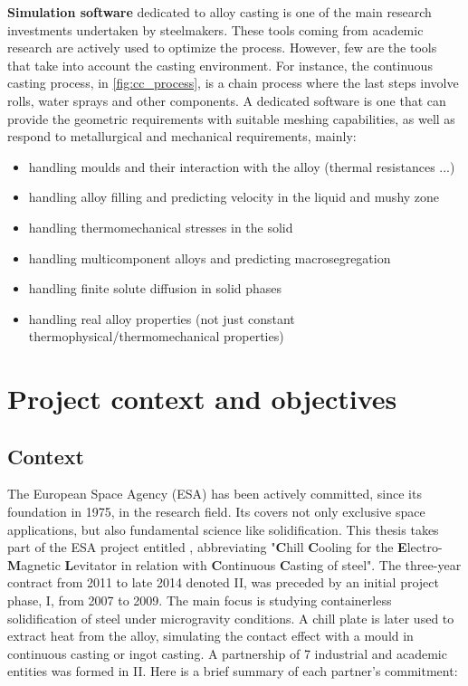 \textbf{Simulation software} dedicated to alloy casting is one of the main research investments undertaken by steelmakers. These tools coming from academic research
are actively used to optimize the process. However, few are the tools that take into account the casting environment. For instance, the continuous casting process, in
\cref{fig:cc_process}, is a chain process where the last steps involve rolls, water sprays and other components. A dedicated software is one that can provide the
geometric requirements with suitable meshing capabilities, as well as respond to metallurgical and mechanical requirements, mainly:
\begin{itemize}
\itemsep0em
\item handling moulds and their interaction with the alloy (thermal resistances ...)
\item handling alloy filling and predicting velocity in the liquid and mushy zone
\item handling thermomechanical stresses in the solid
\item handling multicomponent alloys and predicting macrosegregation
\item handling finite solute diffusion in solid phases
\item handling real alloy properties (not just constant thermophysical/thermomechanical properties)
\end{itemize}
%
%
\section{Project context and objectives}
%
\subsection{Context}
The European Space Agency (ESA) has been actively committed, since its foundation in 1975, in the research field.
Its covers not only exclusive space applications, but also fundamental science like solidification. 
This thesis takes part of the ESA project entitled \ccemlcc, abbreviating
"\textbf{C}hill \textbf{C}ooling for the \textbf{E}lectro-\textbf{M}agnetic \textbf{L}evitator in relation with 
\textbf{C}ontinuous \textbf{C}asting of steel".
The three-year contract from 2011 to late 2014 denoted \ccemlcc II, was preceded by an initial project phase, \ccemlcc I,
from 2007 to 2009. The main focus is studying containerless solidification of steel under microgravity conditions. 
A chill plate is later used to extract heat from the alloy, simulating the contact effect with a mould in continuous casting
or ingot casting.
A partnership of 7 industrial and academic entities was formed in \ccemlcc II. 
Here is a brief summary of each partner's commitment:\\

